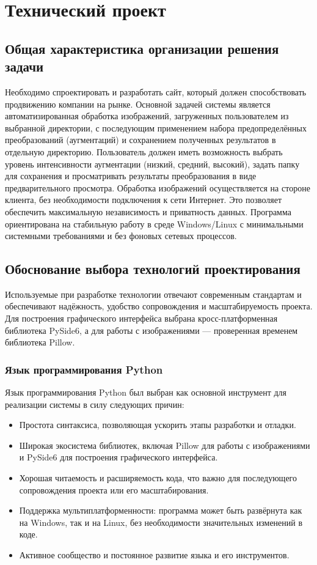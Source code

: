 \section{Технический проект}
\subsection{Общая характеристика организации решения задачи}

Необходимо спроектировать и разработать сайт, который должен способствовать продвижению компании на рынке.
Основной задачей системы является автоматизированная обработка изображений, загруженных пользователем из выбранной директории, с последующим применением набора предопределённых преобразований (аугментаций) и сохранением полученных результатов в отдельную директорию. Пользователь должен иметь возможность выбрать уровень интенсивности аугментации (низкий, средний, высокий), задать папку для сохранения и просматривать результаты преобразования в виде предварительного просмотра.
Обработка изображений осуществляется на стороне клиента, без необходимости подключения к сети Интернет. Это позволяет обеспечить максимальную независимость и приватность данных. Программа ориентирована на стабильную работу в среде Windows/Linux с минимальными системными требованиями и без фоновых сетевых процессов.

\subsection{Обоснование выбора технологий проектирования}

Используемые при разработке технологии отвечают современным стандартам и обеспечивают надёжность, удобство сопровождения и масштабируемость проекта. Для построения графического интерфейса выбрана кросс-платформенная библиотека PySide6, а для работы с изображениями — проверенная временем библиотека Pillow.

\subsubsection{Язык программирования Python}

Язык программирования Python был выбран как основной инструмент для реализации системы в силу следующих причин:

\begin{itemize}
	\item Простота синтаксиса, позволяющая ускорить этапы разработки и отладки.
	\item Широкая экосистема библиотек, включая Pillow для работы с изображениями и PySide6 для построения графического интерфейса.
	\item Хорошая читаемость и расширяемость кода, что важно для последующего сопровождения проекта или его масштабирования.
	\item Поддержка мультиплатформенности: программа может быть развёрнута как на Windows, так и на Linux, без необходимости значительных изменений в коде.
	\item Активное сообщество и постоянное развитие языка и его инструментов.
\end{itemize}


